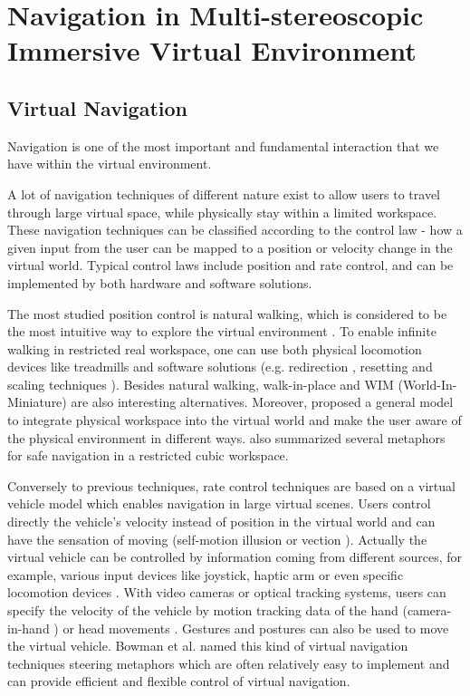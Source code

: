 \chapter{Navigation in Multi-stereoscopic Immersive Virtual Environment}
\label{chapter:cohabitation}
\minitoc

\section{Virtual Navigation}
Navigation is one of the most important and fundamental interaction that we have within the virtual environment.

A lot of navigation techniques of different nature exist to allow users to travel through large virtual space, while physically stay within a limited workspace. These navigation techniques can be classified according to the control law - how a given input from the user can be mapped to a position or velocity change in the virtual world. Typical control laws include position and rate control, and can be implemented by both hardware and software solutions.

The most studied position control is natural walking, which is considered to be the most intuitive way to explore the virtual environment \citep{Ruddle2009BW}. To enable infinite walking in restricted real workspace, one can use both physical locomotion devices like treadmills \citep{Iwata1999Treadmill} and software solutions (e.g. redirection \citep{Peck2008RED}, resetting \citep{Williams2007ELV} and scaling techniques \cite{Interrante2007SLB}). Besides natural walking, walk-in-place \citep{Razzaque2002RWP} and WIM (World-In-Miniature) \citep{Stoakley1995VRW} are also interesting alternatives. Moreover, \citet{Fleury2010Generic} proposed a general model to integrate physical workspace into the virtual world and make the user aware of the physical environment in different ways. \citet{Cirio2012Cube} also summarized several metaphors for safe navigation in a restricted cubic workspace.

Conversely to previous techniques, rate control techniques are based on a virtual vehicle model which enables navigation in large virtual scenes. Users control directly the vehicle's velocity instead of position in the virtual world and can have the sensation of moving (self-motion illusion or vection \citep{Riecke2012Vection}). Actually the virtual vehicle can be controlled by information coming from different sources, for example, various input devices like joystick, haptic arm \citep{Martin2012HDF} or even specific locomotion devices \citep{Marchal2011JOYMAN}. With video cameras or optical tracking systems, users can specify the velocity of the vehicle by motion tracking data of the hand (camera-in-hand \citep{Ware1990EVC}) or head movements \citep{Bourdot2002HCNav}. Gestures \citep{Konrad2003GesturePlay} and postures \citep{Kapri2011Steering} can also be used to move the virtual vehicle. Bowman et al. named this kind of virtual navigation techniques steering metaphors \citep{Bowman2004UIT} which are often relatively easy to implement and can provide efficient and flexible control of virtual navigation.


